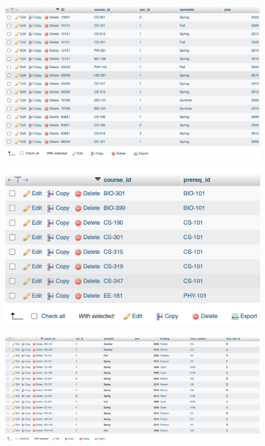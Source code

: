 \documentclass[12pt]{article}
\begin{document}
\newpage

\begin{figure}[!hbt]
    \centering
    \includegraphics[scale=0.5]{screenshots/7 3 teaches.png}
    \label{fig:my_label1}
\end{figure}

\begin{figure}[!hbt]
    \centering
    \includegraphics[scale=0.73]{screenshots/7 3 prereq.png}
    \label{fig:my_label1}
\end{figure}

\newpage

\begin{figure}[!hbt]
    \centering
    \includegraphics[scale=0.42]{screenshots/7 3 section.png}
    \label{fig:my_label1}
\end{figure}
\end{document}
